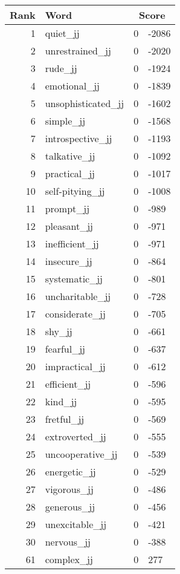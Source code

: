 \begin{longtable}[!htbp]{| rlr@{.}l |}
    \hline
    \textbf{Rank} & \textbf{Word} & \multicolumn{2}{c|}{\textbf{Score}} \\
    \hline
    \endhead
    1 & quiet\_jj & 0 & -2086 \\
    2 & unrestrained\_jj & 0 & -2020 \\
    3 & rude\_jj & 0 & -1924 \\
    4 & emotional\_jj & 0 & -1839 \\
    5 & unsophisticated\_jj & 0 & -1602 \\
    6 & simple\_jj & 0 & -1568 \\
    7 & introspective\_jj & 0 & -1193 \\
    8 & talkative\_jj & 0 & -1092 \\
    9 & practical\_jj & 0 & -1017 \\
    10 & self-pitying\_jj & 0 & -1008 \\
    11 & prompt\_jj & 0 & -989 \\
    12 & pleasant\_jj & 0 & -971 \\
    13 & inefficient\_jj & 0 & -971 \\
    14 & insecure\_jj & 0 & -864 \\
    15 & systematic\_jj & 0 & -801 \\
    16 & uncharitable\_jj & 0 & -728 \\
    17 & considerate\_jj & 0 & -705 \\
    18 & shy\_jj & 0 & -661 \\
    19 & fearful\_jj & 0 & -637 \\
    20 & impractical\_jj & 0 & -612 \\
    21 & efficient\_jj & 0 & -596 \\
    22 & kind\_jj & 0 & -595 \\
    23 & fretful\_jj & 0 & -569 \\
    24 & extroverted\_jj & 0 & -555 \\
    25 & uncooperative\_jj & 0 & -539 \\
    26 & energetic\_jj & 0 & -529 \\
    27 & vigorous\_jj & 0 & -486 \\
    28 & generous\_jj & 0 & -456 \\
    29 & unexcitable\_jj & 0 & -421 \\
    30 & nervous\_jj & 0 & -388 \\
    61 & complex\_jj & 0 & 277 \\

\end{longtable}
